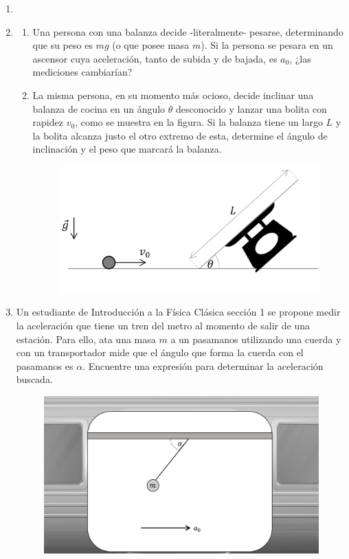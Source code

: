 \documentclass[letterpaper,11pt]{article}
\begin{document}
\vspace{-1cm}
\begin{enumerate}\setlength{\itemsep}{0.4cm}


\item[]

\item 
\begin{enumerate}
    \item Una persona con una balanza decide -literalmente- pesarse, determinando que su peso es $mg$ (o que posee masa $m$). Si la persona se pesara en un ascensor cuya aceleración, tanto de subida y de bajada, es $a_0$, ¿las mediciones cambiarían?
    
    \item La misma persona, en su momento más ocioso, decide inclinar una balanza de cocina en un ángulo $\theta$ desconocido y lanzar una bolita con rapidez $v_0$, como se muestra en la figura. Si la balanza tiene un largo $L$ y la bolita alcanza justo el otro extremo de esta, determine el ángulo de inclinación y el peso que marcará la balanza.
    
    \begin{figure}[H]
        \centering
        \includegraphics[width=0.4\linewidth]{2023-1/img/aux_5/balanza.png}
    \end{figure}
\end{enumerate}

\item 
\begin{multicols}{2}
Un estudiante de Introducción a la Física Clásica sección 1 se propone medir la aceleración que tiene un tren del metro al momento de salir de una estación. Para ello, ata una masa $m$ a un pasamanos utilizando una cuerda y con un transportador mide que el ángulo que forma la cuerda con el pasamanos es $\alpha$. Encuentre una expresión para determinar la aceleración buscada.
\columnbreak
\begin{figure}[H]
    \centering
    \includegraphics[width=0.8\linewidth]{2023-1/img/aux_5/metro.png}
\end{figure}
\end{multicols}


\end{enumerate}
\end{document}
